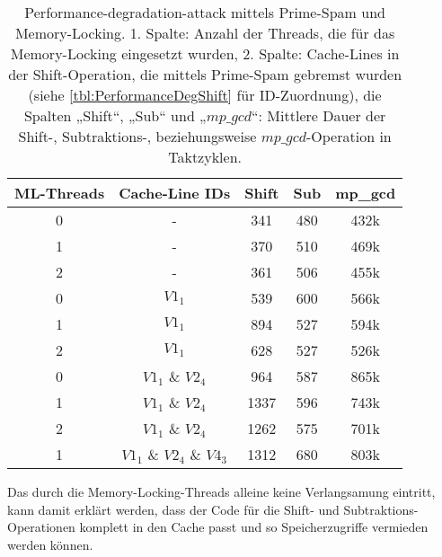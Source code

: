 \begin{table}[h]
\caption{Performance-degradation-attack mittels Prime-Spam und Memory-Locking. 1. Spalte: Anzahl der Threads, die für das Memory-Locking eingesetzt wurden, 2. Spalte: Cache-Lines in der Shift-Operation, die mittels Prime-Spam gebremst wurden (siehe \ref{tbl:PerformanceDegShift} für ID-Zuordnung), die Spalten „Shift“, „Sub“ und „$mp\_gcd$“: Mittlere Dauer der Shift-, Subtraktions-, beziehungsweise $mp\_gcd$-Operation in Taktzyklen.}
\label{tbl:MemoryLockingResults}
\begin{tabular}{ccccc}
\toprule
ML-Threads & Cache-Line IDs     & Shift & Sub & mp\_gcd \\
\midrule
0                   & -               & 341   & 480 & 432k    \\
1                   & -               & 370   & 510 & 469k    \\
2                   & -               & 361   & 506 & 455k    \\
0                   & $V1_1$              & 539   & 600 & 566k    \\
1                   & $V1_1$              & 894   & 527 & 594k    \\
2                   & $V1_1$              & 628   & 527 & 526k    \\
0                   & $V1_1$ \& $V2_4$        & 964   & 587 & 865k    \\
1                   & $V1_1$ \& $V2_4$        & 1337  & 596 & 743k    \\
2                   & $V1_1$ \& $V2_4$        & 1262  & 575 & 701k    \\
1                   & $V1_1$ \& $V2_4$ \& $V4_3$ & 1312  & 680 & 803k   \\
\bottomrule
\end{tabular}
\end{table}

Das durch die Memory-Locking-Threads alleine keine Verlangsamung eintritt, kann damit erklärt werden, dass der Code für die Shift- und Subtraktions-Operationen komplett in den Cache passt und so Speicherzugriffe vermieden werden können.

